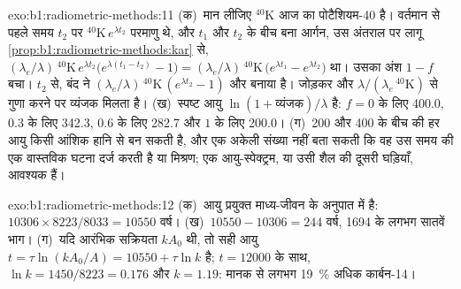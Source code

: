 \begin{solution}{exo:b1:radiometric-methods:11}
(क)~मान लीजिए ${}^{40}\mathrm{K}$ आज का पोटैशियम-40 है। वर्तमान से पहले समय $t_2$ पर ${}^{40}\mathrm{K}\,e^{\lambda t_2}$ परमाणु थे, और $t_1$ और $t_2$ के बीच बना आर्गन, उस अंतराल पर लागू \cref{prop:b1:radiometric-methods:kar} से, $(\lambda_e/\lambda)\,{}^{40}\mathrm{K}\,e^{\lambda
t_2}\bigl(e^{\lambda (t_1 - t_2)} - 1\bigr) = (\lambda_e/\lambda)\,
{}^{40}\mathrm{K}\,\bigl(e^{\lambda t_1} - e^{\lambda t_2}\bigr)$ था। उसका अंश $1 - f$ बचा। $t_2$ से, बंद  ने $(\lambda_e/\lambda)\,{}^{40}\mathrm{K}\,(e^{\lambda t_2} - 1)$ और बनाया है। जोड़कर और $\lambda/(\lambda_e\,{}^{40}\mathrm{K})$ से गुणा करने पर व्यंजक मिलता है। (ख)~स्पष्ट आयु $\ln(1 + \text{व्यंजक})/\lambda$ है: $f = 0$ के लिए \qty{400.0}{\Myr}, $0.3$ के लिए \qty{342.3}{\Myr}, $0.6$ के लिए \qty{282.7}{\Myr} और $1$ के लिए \qty{200.0}{\Myr}। (ग)~\qty{200}{\Myr} और \qty{400}{\Myr} के बीच की हर आयु किसी आंशिक हानि से बन सकती है, और एक अकेली संख्या नहीं बता सकती कि वह उस समय की एक वास्तविक घटना दर्ज करती है या मिश्रण; एक आयु-स्पेक्ट्रम, या उसी शैल की दूसरी घड़ियाँ, आवश्यक हैं।
\end{solution}

\begin{solution}{exo:b1:radiometric-methods:12}
(क)~आयु प्रयुक्त माध्य-जीवन के अनुपात में है: $10306 \times 8223/8033 =
\num{10550}$ वर्ष। (ख)~$10550 - 10306 = 244$ वर्ष, \num{1694} के लगभग सातवें भाग। (ग)~यदि आरंभिक सक्रियता $k A_0$ थी, तो सही आयु $t = \tau
\ln(k A_0/A) = \num{10550} + \tau \ln k$ है; $t = \num{12000}$ के साथ, $\ln k =
1450/8223 = 0.176$ और $k = 1.19$: मानक से लगभग \qty{19}{\percent} अधिक कार्बन-14।
\end{solution}

